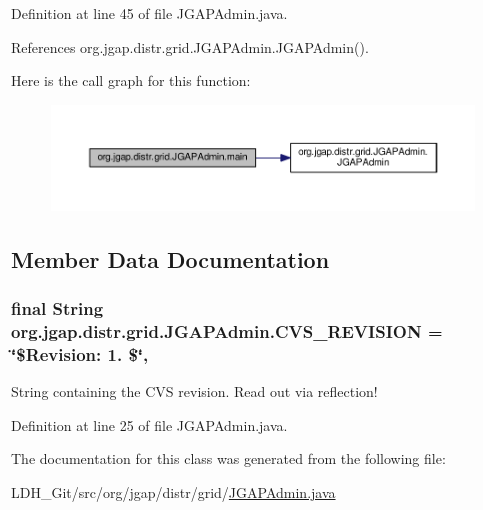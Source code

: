 Definition at line 45 of file J\-G\-A\-P\-Admin.\-java.



References org.\-jgap.\-distr.\-grid.\-J\-G\-A\-P\-Admin.\-J\-G\-A\-P\-Admin().



Here is the call graph for this function\-:
\nopagebreak
\begin{figure}[H]
\begin{center}
\leavevmode
\includegraphics[width=350pt]{classorg_1_1jgap_1_1distr_1_1grid_1_1_j_g_a_p_admin_aa6651384744d7798b91a71e3f68b012d_cgraph}
\end{center}
\end{figure}




\subsection{Member Data Documentation}
\hypertarget{classorg_1_1jgap_1_1distr_1_1grid_1_1_j_g_a_p_admin_a35f7f6ea50cdc1d6138507bfd876ec78}{
\subsubsection[{C\-V\-S\-\_\-\-R\-E\-V\-I\-S\-I\-O\-N}]{\setlength{\rightskip}{0pt plus 5cm}final String org.\-jgap.\-distr.\-grid.\-J\-G\-A\-P\-Admin.\-C\-V\-S\-\_\-\-R\-E\-V\-I\-S\-I\-O\-N = \char`\"{}\$Revision\-: 1. \$\char`\"{}\hspace{0.3cm}{\ttfamily [static]}, {\ttfamily [private]}}}\label{classorg_1_1jgap_1_1distr_1_1grid_1_1_j_g_a_p_admin_a35f7f6ea50cdc1d6138507bfd876ec78}
String containing the C\-V\-S revision. Read out via reflection! 

Definition at line 25 of file J\-G\-A\-P\-Admin.\-java.



The documentation for this class was generated from the following file\-:\begin{DoxyCompactItemize}
\item 
L\-D\-H\-\_\-\-Git/src/org/jgap/distr/grid/\hyperlink{_j_g_a_p_admin_8java}{J\-G\-A\-P\-Admin.\-java}\end{DoxyCompactItemize}
